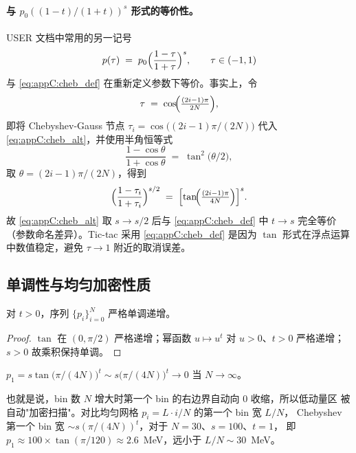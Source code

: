 \paragraph{与 $p_0((1-t)/(1+t))^{s}$ 形式的等价性。}
USER 文档中常用的另一记号
\begin{equation}
  p(\tau) \;=\; p_0 \Bigl(\frac{1-\tau}{1+\tau}\Bigr)^{s}, \qquad \tau\in(-1,1)
  \label{eq:appC:cheb_alt}
\end{equation}
与 \eqref{eq:appC:cheb_def} 在重新定义参数下等价。事实上，令
\begin{equation}
  \tau \;=\; \cos\!\Bigl(\tfrac{(2i-1)\pi}{2N}\Bigr),
\end{equation}
即将 Chebyshev-Gauss 节点 $\tau_i=\cos\bigl((2i-1)\pi/(2N)\bigr)$ 代入
\eqref{eq:appC:cheb_alt}，并使用半角恒等式
\begin{equation}
  \frac{1-\cos\theta}{1+\cos\theta} \;=\; \tan^{2}\!\bigl(\theta/2\bigr),
\end{equation}
取 $\theta=(2i-1)\pi/(2N)$，得到
\begin{equation}
  \Bigl(\frac{1-\tau_i}{1+\tau_i}\Bigr)^{s/2}
  \;=\; \Bigl[\tan\!\Bigl(\tfrac{(2i-1)\pi}{4N}\Bigr)\Bigr]^{s}.
\end{equation}
故 \eqref{eq:appC:cheb_alt} 取 $s\to s/2$ 后与 \eqref{eq:appC:cheb_def} 中
$t\to s$ 完全等价（参数命名差异）。Tic-tac 采用 \eqref{eq:appC:cheb_def}
是因为 $\tan$ 形式在浮点运算中数值稳定，避免 $\tau\to 1$ 附近的取消误差。

\subsection{单调性与均匀加密性质}

\begin{proposition}[严格单调]
对 $t>0$，序列 $\{p_i\}_{i=0}^{N}$ 严格单调递增。
\end{proposition}

\begin{proof}
$\tan$ 在 $(0,\pi/2)$ 严格递增；幂函数 $u\mapsto u^{t}$ 对 $u>0$、$t>0$ 严格递增；
$s>0$ 故乘积保持单调。
\end{proof}

\begin{proposition}[低端加密]
$p_1=s\tan\bigl(\pi/(4N)\bigr)^{t}\sim s\bigl(\pi/(4N)\bigr)^{t}\to 0$ 当 $N\to\infty$。
\end{proposition}

也就是说，bin 数 $N$ 增大时第一个 bin 的右边界自动向 $0$ 收缩，所以低动量区
被自动"加密扫描"。对比均匀网格 $p_i=L\cdot i/N$ 的第一个 bin 宽 $L/N$，
Chebyshev 第一个 bin 宽 $\sim s(\pi/(4N))^{t}$，对于 $N=30$、$s=100$、$t=1$，
即 $p_1\approx 100\times\tan(\pi/120)\approx 2.6$~MeV，远小于 $L/N\sim 30$~MeV。

